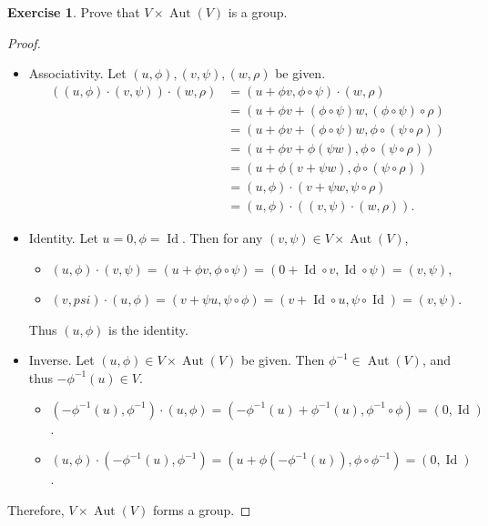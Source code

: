\documentclass[12pt, psamsfonts]{amsart}
\theoremstyle{definition}
\newtheorem*{exer}{Exercise}
\theoremstyle{remark}
\DeclareMathOperator{\Aut}{Aut}
\DeclareMathOperator{\Id}{Id}
\numberwithin{equation}{section}
\begin{document}
\begin{exer}
  Prove that $V \times \Aut(V)$ is a group.
\end{exer}

\begin{proof}
  $ $
  \begin{itemize}
    \item
      Associativity.
      Let $(u, \phi), (v, \psi), (w, \rho)$ be given.
      \begin{align*}
        ((u, \phi) \cdot (v, \psi)) \cdot (w, \rho)
          &= (u + \phi v, \phi \circ \psi) \cdot (w, \rho) \\
          &= (u + \phi v + (\phi \circ \psi) w, (\phi \circ \psi) \circ \rho) \\
          &= (u + \phi v + (\phi \circ \psi) w, \phi \circ (\psi \circ \rho)) \\
          &= (u + \phi v + \phi(\psi w), \phi \circ (\psi \circ \rho)) \\
          &= (u + \phi(v + \psi w), \phi \circ (\psi \circ \rho)) \\
          &= (u, \phi) \cdot (v + \psi w, \psi \circ \rho) \\
          &= (u, \phi) \cdot ((v, \psi) \cdot (w, \rho)).
      \end{align*}
    \item
      Identity.
      Let $u = 0, \phi = \Id$.
      Then for any $(v, \psi) \in V \times \Aut(V)$,
      \begin{itemize}
        \item
          $(u, \phi) \cdot (v, \psi) = (u + \phi v, \phi \circ \psi) = (0 + \Id \circ v, \Id \circ \psi) = (v, \psi)$,
        \item
          $(v, psi) \cdot (u, \phi) = (v + \psi u, \psi \circ \phi) = (v + \Id \circ u, \psi \circ \Id) = (v, \psi)$.
      \end{itemize}

      Thus $(u, \phi)$ is the identity.
    \item
      Inverse.
      Let $(u, \phi) \in V \times \Aut(V)$ be given.
      Then $\phi^{-1} \in \Aut(V)$, and thus $-\phi^{-1}(u) \in V$.
      \begin{itemize}
        \item
          $(-\phi^{-1}(u), \phi^{-1}) \cdot (u, \phi) = (-\phi^{-1}(u) + \phi^{-1}(u), \phi^{-1} \circ \phi) = (0, \Id)$.
        \item
          $(u, \phi) \cdot (-\phi^{-1}(u), \phi^{-1}) = (u + \phi(-\phi^{-1}(u)), \phi \circ \phi^{-1}) = (0, \Id)$.
      \end{itemize}
  \end{itemize}
  Therefore, $V \times \Aut(V)$ forms a group.
\end{proof}
\end{document}
